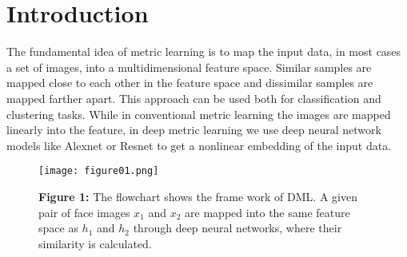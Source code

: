 \documentclass[12pt,paper=a4]{scrartcl}
\theoremstyle{break}
\begin{document}
\section{Introduction}
The fundamental idea of metric learning is to map the input data, in most cases a set of images, into a multidimensional feature space. Similar samples are mapped close to each other in the feature space and dissimilar samples are mapped farther apart. This approach can be used both for classification and clustering tasks. While in conventional metric learning the images are mapped linearly into the feature, in deep metric learning we use deep neural network models like Alexnet or Resnet to get a nonlinear embedding of the input data.

\begin{figure}[h]
	\centering
  \texttt{[image: figure01.png]}
  \caption{\textbf{Figure 1:} The flowchart shows the frame work of DML. A given pair of face images $x_1$ and $x_2$ are mapped into the same feature space as $h_1$ and $h_2$ through deep neural networks, where their similarity is calculated.}
\end{figure}
\end{document}
